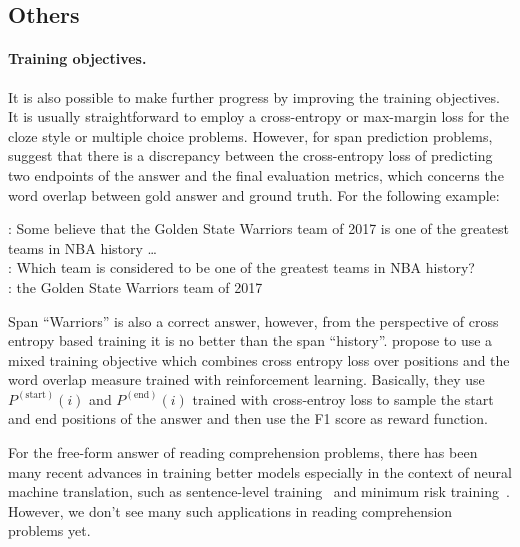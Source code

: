 \subsection{Others}

\paragraph{Training objectives.} It is also possible to make further progress by improving the training objectives. It is usually straightforward to employ a cross-entropy or max-margin loss for the cloze style or multiple choice problems. However, for span prediction problems,  suggest that there is a discrepancy between the cross-entropy loss of predicting two endpoints of the answer and the final evaluation metrics, which concerns the word overlap between gold answer and ground truth. For the following example:

\begin{displayquote}
: Some believe that the Golden State Warriors team of 2017 is one of the greatest teams in NBA history \ldots \\
: Which team is considered to be one of the greatest teams in NBA history? \\
: the Golden State Warriors team of 2017
\end{displayquote}
Span ``Warriors'' is also a correct answer, however, from the perspective of cross entropy based training it is no better than the span ``history''.  propose to use a mixed training objective which combines cross entropy loss over positions and the word overlap measure trained with reinforcement learning. Basically, they use $P^{(\text{start})}(i)$ and $P^{(\text{end})}(i)$ trained with cross-entroy loss to sample the start and end positions of the answer and then use the F1 score as reward function.

For the free-form answer of reading comprehension problems, there has been many recent advances in training better  models especially in the context of neural machine translation, such as sentence-level training~\cite{ranzato2016sequence} and minimum risk training~\cite{shen2016minimum}. However, we don't see many such applications in reading comprehension problems yet.

